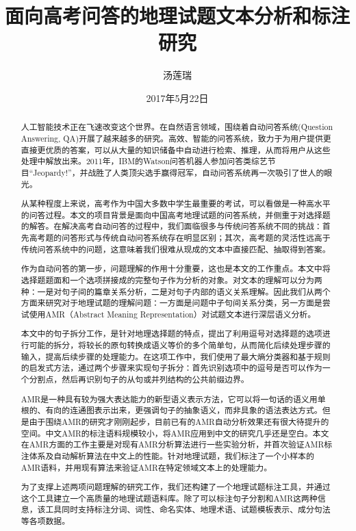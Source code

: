 \documentclass[master, winfont]{njuthesis}
\title{面向高考问答的地理试题文本分析和标注研究}
\author{汤莲瑞}
\institute{南京大学}
\date{2017年5月22日}
\begin{document}

\maketitle
\makeenglishtitle


\frontmatter

\begin{abstract}
人工智能技术正在飞速改变这个世界。在自然语言领域，围绕着自动问答系统(Question Answering, QA)开展了越来越多的研究。高效、智能的问答系统，致力于为用户提供更直接更优质的答案，可以从大量的知识储备中自动进行检索、推理，从而将用户从这些处理中解放出来。2011年，IBM的Watson问答机器人参加问答类综艺节目“Jeopardy!”，并战胜了人类顶尖选手赢得冠军，自动问答系统再一次吸引了世人的眼光。

从某种程度上来说，高考作为中国大多数中学生最重要的考试，可以看做是一种高水平的问答过程。本文的项目背景是面向中国高考地理试题的问答系统，并侧重于对选择题的解答。在解决高考自动问答的过程中，我们面临很多与传统问答系统不同的挑战：首先高考题的问答形式与传统自动问答系统存在明显区别；其次，高考题的灵活性远高于传统问答系统中的问题，这意味着我们很难从现成的文本中直接匹配、抽取得到答案。

作为自动问答的第一步，问题理解的作用十分重要，这也是本文的工作重点。本文中将选择题题面和一个选项拼接成的完整句子作为分析的对象。对文本的理解可以分为两种：一是对句子间的篇章关系分析，二是对句子内部的语义关系理解。因此我们从两个方面来研究对于地理试题的理解问题：一方面是问题中子句间关系分类，另一方面是尝试使用AMR（Abstract Meaning Representation）对试题文本进行深层语义分析。

本文中的句子拆分工作，是针对地理选择题的特点，提出了利用逗号对选择题的选项进行可能的拆分，将较长的原句转换成语义等价的多个简单句，从而简化后续处理步骤的输入，提高后续步骤的处理能力。在这项工作中，我们使用了最大熵分类器和基于规则的启发式方法，通过两个步骤来实现句子拆分：首先识别选项中的逗号是否可以作为一个分割点，然后再识别句子的从句或并列结构的公共前缀边界。

AMR是一种具有较为强大表达能力的新型语义表示方法，它可以将一句话的语义用单根的、有向的连通图表示出来，更强调句子的抽象语义，而非具象的语法表达方式。但是由于围绕AMR的研究才刚刚起步，目前已有的AMR自动分析效果还有很大待提升的空间。中文AMR的标注语料规模较小，将AMR应用到中文的研究几乎还是空白。本文在AMR方面的工作主要是对现有AMR分析算法进行一些实验分析，并首次验证AMR标注体系及自动解析算法在中文上的性能。针对地理试题，我们标注了一个小样本的AMR语料，并用现有算法来验证AMR在特定领域文本上的处理能力。

为了支撑上述两项问题理解的研究工作，我们还构建了一个地理试题标注工具，并通过这个工具建立一个高质量的地理试题语料库。除了可以标注句子分割和AMR这两种信息，该工具同时支持标注分词、词性、命名实体、地理术语、试题模板表示、成分句法等各项数据。

\end{abstract}
\end{document}
